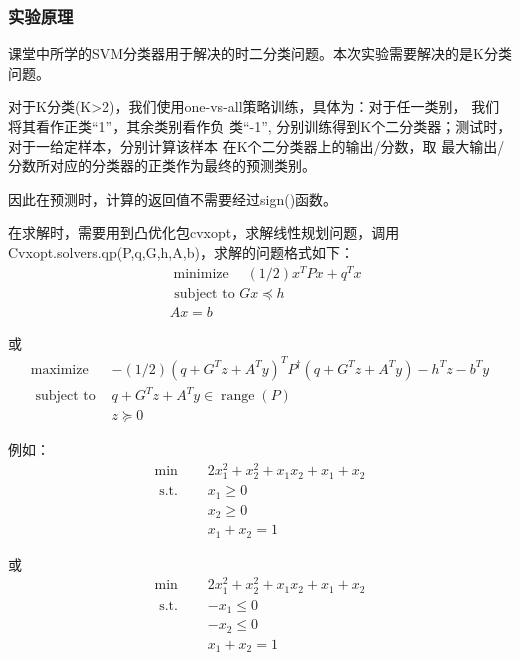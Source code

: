 \documentclass{ctexart}
\begin{document}
\subsubsection{\hei 实验原理}
课堂中所学的SVM分类器用于解决的时二分类问题。本次实验需要解决的是K分类问题。
\par 对于K分类(K>2)，我们使用one-vs-all策略训练，具体为：对于任一类别，
我们将其看作正类“1”，其余类别看作负
类“-1”, 分别训练得到K个二分类器；测试时，对于一给定样本，分别计算该样本
在K个二分类器上的输出/分数，取
最大输出/分数所对应的分类器的正类作为最终的预测类别。
\par 因此在预测时，计算的返回值不需要经过sign()函数。
\par 在求解时，需要用到凸优化包cvxopt，求解线性规划问题，调用Cvxopt.solvers.qp(P,q,G,h,A,b)，求解的问题格式如下：
\begin{equation}
    \begin{aligned}
         & \operatorname{minimize} \quad(1 / 2) x^{T} P x+q^{T} x \\
         & \text { subject to } G x \preceq h                     \\
         & A x=b
    \end{aligned}
\end{equation}
\par 或
\begin{equation}
    \begin{array}{cl}
        \operatorname{maximize} & -(1 / 2)\left(q+G^{T} z+A^{T} y\right)^{T} P^{\dagger}\left(q+G^{T} z+A^{T} y\right)-h^{T} z-b^{T} y \\
        \text { subject to }    & q+G^{T} z+A^{T} y \in \operatorname{range}(P)                                                        \\
                                & z \succeq 0
    \end{array}
\end{equation}
\par 例如：
\begin{equation}
    \begin{array}{ll}
        \min                 & 2 x_{1}^{2}+x_{2}^{2}+x_{1} x_{2}+x_{1}+x_{2} \\
        \text { s.t. } \quad & x_{1} \geq 0                                  \\
                             & x_{2} \geq 0                                  \\
                             & x_{1}+x_{2}=1
    \end{array}
\end{equation}
\par 或
\begin{equation}
    \begin{array}{ll}
        \min                 & 2 x_{1}^{2}+x_{2}^{2}+x_{1} x_{2}+x_{1}+x_{2} \\
        \text { s.t. } \quad & -x_{1} \leq 0                                 \\
        \quad                & -x_{2} \leq 0                                 \\
                             & x_{1}+x_{2}=1
    \end{array}
\end{equation}
\end{document}
